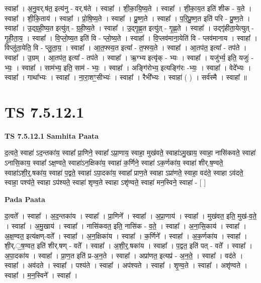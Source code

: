 \documentclass[17pt]{extarticle}
\begin{document}
स्वाहा᳚ । अ॒नु॒वर्.ष॑त॒ इत्य॑नु - वर्.ष॑ते । स्वाहा᳚ । शी॒का॒यि॒ष्य॒ते । स्वाहा᳚ । शी॒का॒य॒त इति॑ शीक - य॒ते । स्वाहा᳚ । शी॒कि॒ताय॑ । स्वाहा᳚ । प्रो॒षि॒ष्य॒ते । स्वाहा᳚ । प्रु॒ष्ण॒ते । स्वाहा᳚ । प॒रि॒प्रु॒ष्ण॒त इति॑ परि - प्रु॒ष्ण॒ते । स्वाहा᳚ । उ॒द्ग्र॒ही॒ष्य॒त इत्यु॑त् - ग्र॒ही॒ष्य॒ते । स्वाहा᳚ । उ॒द्गृ॒ह्ण॒त इत्यु॑त् - गृ॒ह्ण॒ते । स्वाहा᳚ । उद्गृ॑हीता॒येत्युत् -   गृ॒ही॒ता॒य॒ । स्वाहा᳚ । वि॒प्लो॒ष्य॒त इति॑ वि - प्लो॒ष्य॒ते । स्वाहा᳚ । वि॒प्लव॑माना॒येति॑ वि - प्लव॑मानाय । स्वाहा᳚ । विप्लु॑ता॒येति॒ वि - प्लु॒ता॒य॒ । स्वाहा᳚ । आ॒त॒फ्स्य॒त इत्या᳚ - त॒फ्स्य॒ते । स्वाहा᳚ । आ॒तप॑त॒ इत्या᳚ - तप॑ते । स्वाहा᳚ । उ॒ग्रम् । आ॒तप॑त॒ इत्या᳚ - तप॑ते । स्वाहा᳚ । ऋ॒ग्भ्य इत्यृ॑क् - भ्यः । स्वाहा᳚ । यजु॑र्भ्य॒ इति॒ यजुः॑ - भ्यः॒ । स्वाहा᳚ । साम॑भ्य॒ इति॒ साम॑ - भ्यः॒ । स्वाहा᳚ । अङ्गि॑रोभ्य॒ इत्यङ्गि॑रः -भ्यः॒ । स्वाहा᳚ । वेदे᳚भ्यः । स्वाहा᳚ । गाथा᳚भ्यः । स्वाहा᳚ । ना॒रा॒शꣳ॒॒सीभ्यः॑ । स्वाहा᳚ । रैभी᳚भ्यः । स्वाहा॑ ( ) । सर्व॑स्मै । स्वाहा᳚ ॥  \newline




\section*{ TS 7.5.12.1 }

\textbf{TS 7.5.12.1 } \newline
\textbf{Samhita Paata} \newline

द॒त्वते॒ स्वाहा॑ ऽद॒न्तका॑य॒ स्वाहा᳚ प्रा॒णिने॒ स्वाहा᳚ ऽप्रा॒णाय॒ स्वाहा॒ मुख॑वते॒ स्वाहा॑ऽमु॒खाय॒ स्वाहा॒ नासि॑कवते॒ स्वाहा॑ ऽनासि॒काय॒ स्वाहा᳚ ऽक्ष॒ण्वते॒ स्वाहा॑ऽन॒क्षिका॑य॒ स्वाहा॑ क॒र्णिने॒ स्वाहा॑ ऽक॒र्णका॑य॒ स्वाहा॑ शीर्.ष॒ण्वते॒ स्वाहा॑ऽशी॒र्॒.षका॑य॒ स्वाहा॑ प॒द्वते॒ स्वाहा॑ ऽपा॒दका॑य॒ स्वाहा᳚ प्राण॒ते स्वाहा ऽप्रा॑णते॒ स्वाहा॒ वद॑ते॒ स्वाहा ऽव॑दते॒ स्वाहा॒ पश्य॑ते॒ स्वाहा ऽप॑श्यते॒ स्वाहा॑ शृण्व॒ते स्वाहा ऽशृ॑ण्वते॒ स्वाहा॑ मन॒स्विने॒ स्वाहा॑ - [  ] \newline

\textbf{Pada Paata} \newline

द॒त्वते᳚ । स्वाहा᳚ । अ॒द॒न्तका॑य । स्वाहा᳚ । प्रा॒णिने᳚ । स्वाहा᳚ । अ॒प्रा॒णाय॑ । स्वाहा᳚ । मुख॑वत॒ इति॒ मुख॑-व॒ते॒ । स्वाहा᳚ । अ॒मु॒खाय॑ । स्वाहा᳚ । नासि॑कवत॒ इति॒ नासि॑क - व॒ते॒ । स्वाहा᳚ । अ॒ना॒सि॒काय॑ । स्वाहा᳚ । अ॒क्ष॒ण्वत॒ इत्य॑क्षण्-वते᳚ । स्वाहा᳚ । अ॒न॒क्षिका॑य । स्वाहा᳚ । क॒र्णिने᳚ । स्वाहा᳚ । अ॒क॒र्णका॑य । स्वाहा᳚ । शी॒र्.॒ष॒ण्वत॒ इति॑ शीर्.षण् - वते᳚ । स्वाहा᳚ । अ॒शी॒र्॒.षका॑य । स्वाहा᳚ । प॒द्वत॒ इति॑ पत् - वते᳚ । स्वाहा᳚ । अ॒पा॒दका॑य । स्वाहा᳚ । प्रा॒ण॒त इति॑ प्र-अ॒न॒ते । स्वाहा᳚ । अप्रा॑णत॒ इत्यप्र॑ - अ॒न॒ते॒ । स्वाहा᳚ । वद॑ते । स्वाहा᳚ । अव॑दते । स्वाहा᳚ । पश्य॑ते । स्वाहा᳚ । अप॑श्यते । स्वाहा᳚ । शृ॒ण्व॒ते । स्वाहा᳚ । अशृ॑ण्वते । स्वाहा᳚ । म॒न॒स्विने᳚ । स्वाहा᳚ ।  \newline
\end{document}
